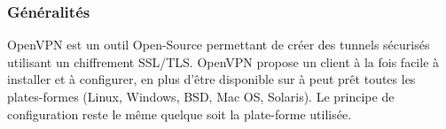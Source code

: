 \subsubsection{Généralités}

OpenVPN est un outil Open-Source permettant de créer des tunnels sécurisés utilisant un chiffrement SSL/TLS. OpenVPN propose un client à la fois facile à installer et à configurer, en plus d'être disponible sur à peut prêt toutes les plates-formes (Linux, Windows, BSD, Mac OS, Solaris). Le principe de configuration reste le même quelque soit la plate-forme utilisée.

% 
% 
% 
% 
% 
% 

